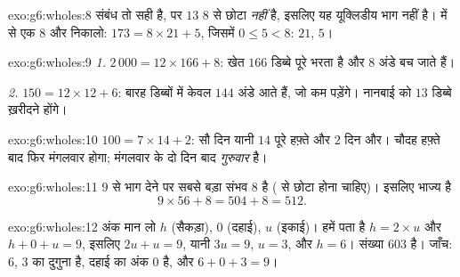 \begin{solution}{exo:g6:wholes:8}
संबंध तो सही है, पर  $13$  $8$ से छोटा \emph{नहीं} है,
इसलिए यह यूक्लिडीय भाग नहीं है।  में से एक $8$ और निकालो:
$173 = 8 \times 21 + 5$, जिसमें $0 \leq 5 < 8$:
 $21$,  $5$।
\end{solution}

\begin{solution}{exo:g6:wholes:9}
\emph{1.} $2\,000 = 12 \times 166 + 8$: खेत $166$ डिब्बे पूरे
भरता है और $8$ अंडे बच जाते हैं।

\emph{2.} $150 = 12 \times 12 + 6$: बारह डिब्बों में केवल $144$
अंडे आते हैं, जो कम पड़ेंगे। नानबाई को $13$ डिब्बे ख़रीदने होंगे।
\end{solution}

\begin{solution}{exo:g6:wholes:10}
$100 = 7 \times 14 + 2$: सौ दिन यानी $14$ पूरे हफ़्ते और $2$ दिन
और। चौदह हफ़्ते बाद फिर मंगलवार होगा; मंगलवार के दो दिन बाद
\emph{गुरुवार} है।
\end{solution}

\begin{solution}{exo:g6:wholes:11}
$9$ से भाग देने पर सबसे बड़ा संभव  $8$ है (  से
छोटा होना चाहिए)। इसलिए भाज्य है
\[
9 \times 56 + 8 = 504 + 8 = 512 .
\]
\end{solution}

\begin{solution}{exo:g6:wholes:12}
अंक मान लो $h$ (सैकड़ा), $0$ (दहाई), $u$ (इकाई)। हमें पता है
$h = 2 \times u$ और $h + 0 + u = 9$, इसलिए $2u + u = 9$, यानी
$3u = 9$, $u = 3$, और $h = 6$। संख्या $603$ है। जाँच: $6$, $3$
का दुगुना है, दहाई का अंक $0$ है, और $6 + 0 + 3 = 9$।
\end{solution}

